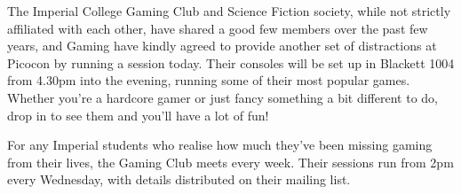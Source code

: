 The Imperial College Gaming Club and Science Fiction society, while not strictly affiliated with each other, have shared a good few members over the past few years, and Gaming have kindly agreed to provide another set of distractions at Picocon by running a session today. Their consoles will be set up in Blackett 1004 from 4.30pm into the evening, running some of their most popular games. Whether you're a hardcore gamer or just fancy something a bit different to do, drop in to see them and you'll have a lot of fun!

For any Imperial students who realise how much they've been missing gaming from their lives, the Gaming Club meets every week. Their sessions run from 2pm every Wednesday, with details distributed on their mailing list. 